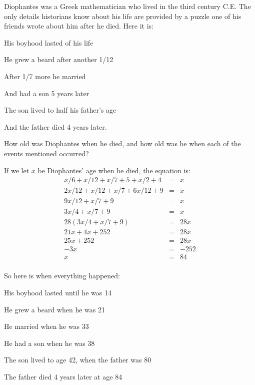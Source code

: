 \documentclass[letterpaper]{exam}
\begin{document}
  \begin{questions}

    \question{}
    Diophantes was a Greek mathematician who lived in the third century C.E.  The only details
    historians know about his life are provided by a puzzle one of his friends wrote about him after
    he died.  Here it is:

    \begin{itemize*}
      \item His boyhood lasted  of his life
      \item He grew a beard after another 1/12
      \item After 1/7 more he married
      \item And had a son 5 years later
      \item The son lived to half his father's age
      \item And the father died 4 years later.
    \end{itemize*}

    How old was Diophantes when he died, and how old was he when each of the events mentioned occurred?

    \begin{solution}
    If we let $x$ be Diophantes' age when he died, the equation is:
    \begin{align*}
      x/6 + x/12 + x/7 + 5 + x/2 + 4 &=& x \\
      2x/12 + x/12 + x/7 + 6x/12 + 9 &=& x \\
      9x/12 + x/7 + 9 &=& x \\
      3x/4 + x/7 + 9 &=& x \\
      28(3x/4 + x/7 + 9) &=& 28x \\
      21x + 4x + 252 &=& 28x \\
      25x + 252 &=& 28x \\
      -3x &=& -252 \\
      x &=& 84 \\
    \end{align*}

    So here is when everything happened:
    \begin{itemize*}
      \item His boyhood lasted until he was 14
      \item He grew a beard when he was 21 
      \item He married when he was 33
      \item He had a son when he was 38
      \item The son lived to age 42, when the father was 80
      \item The father died 4 years later at age 84
    \end{itemize*}


\end{solution}
\end{questions}
\end{document}
